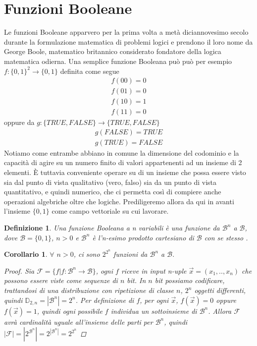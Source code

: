 \documentclass[12pt,a4paper,openright]{report}
\newtheorem{mydef}{Definizione}[chapter]
\newtheorem*{mycor}{Corollario}
\begin{document}
\section{Funzioni Booleane}
Le funzioni Booleane apparvero per la prima volta a metà diciannovesimo secolo durante la formulazione matematica di problemi logici e prendono
il loro nome da George Boole, matematico britannico considerato fondatore della logica matematica odierna\cite{ref2}.\newpage
Una semplice funzione Booleana può può per esempio $f:\{0,1\}^2 \rightarrow \{0,1\}$ definita come segue
\begin{align*}  
    f(00) = 0 \\
    f(01) = 0 \\
    f(10) = 1 \\
    f(11) = 0
\end{align*}
oppure da $g:\{\mathit{TRUE},\mathit{FALSE}\}\rightarrow{\{\mathit{TRUE},\mathit{FALSE}\}}$
\begin{align*}
    g(\mathit{FALSE}) = \mathit{TRUE} \\
    g(\mathit{TRUE}) = \mathit{FALSE} 
\end{align*}
Notiamo come entrambe abbiano in comune la dimensione del codominio e la capacità di agire su un numero finito di valori appartenenti ad un insieme di 2 elementi.
È tuttavia conveniente operare su di un insieme che possa essere visto sia dal punto di vista qualitativo (vero, falso)
sia da un punto di vista quantitativo, e quindi numerico, che ci permetta così di compiere anche operazioni algebriche oltre che logiche. Prediligeremo allora da qui in avanti l'insieme
$\{0,1\}$ come campo vettoriale su cui lavorare.
\par
\begin{mydef}
    Una \textnormal{funzione Booleana a \textit{n} variabili} è una funzione da $\mathcal{B}^n$ a $\mathcal{B}$,
    dove $\mathcal{B} = \{0,1\}$, $n > 0$ e $\mathcal{B}^n$ è l'n-esimo prodotto cartesiano di $\mathcal{B}$ con se stesso \cite{ref3}.
\end{mydef}
\begin{mycor}
    $\forall$ $n > 0$, ci sono $2^{2^{n}}$ funzioni da $\mathcal{B}^n$ a $\mathcal{B}.$
    
    \begin{proof}
        Sia $\mathcal{F}=\{f|f:\mathcal{B}^n\rightarrow{\mathcal{B}}\}$,
        ogni $f$ riceve in input n-uple $\vec{x}=(x_1,..,x_n)$ che possono essere viste come sequenze di $n$ bit.
        In $n$ bit possiamo codificare, trattandosi di una distribuzione con ripetizione di classe $n$, $2^n$ oggetti differenti, quindi $\mathbb{D}_{2,n}=\left\vert{\mathcal{B}^n}\right\vert = 2^n$.
        Per definizione di $f$, per ogni $\vec{x}$, $f(\vec{x}) = 0$  oppure  $f(\vec{x}) = 1$, quindi ogni possibile $f$ individua un sottoinsieme di $\mathcal{B}^n$. Allora $\mathcal{F}$ avrà cardinalità uguale all'insieme delle parti per 
        $\mathcal{B}^n$, quindi  $\left\vert{\mathcal{F}}\right\vert = \left\vert{2^{\mathcal{B}^n}}\right\vert= 2^{\left\vert{\mathcal{B}^n}\right\vert} = 2^{2^{n}}$
    \end{proof}

\end{mycor}
\end{document}
